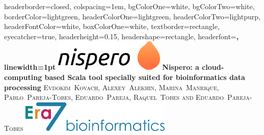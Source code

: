 \documentclass[portrait,a0paper,fontscale=0.285]{baposter} %
\begin{document}
\begin{poster}
{
headerborder=closed, %
colspacing=1em, %
bgColorOne=white, %
bgColorTwo=white, %
borderColor=lightgreen, %
headerColorOne=lightgreen, %
headerColorTwo=lightpurp, %
headerFontColor=white, %
boxColorOne=white, %
textborder=rectangle, %
eyecatcher=true, %
headerheight=0.15\textheight, %
headershape=rectangle, %
headerfont=\Large\bf\textsc, %
linewidth=1pt %
}
%
{\includegraphics[height=4em]{nispero.png}} %
{\hspace{1em}\bf{Nispero: a cloud-computing based Scala tool specially suited for bioinformatics data
processing}} %
{\textsc{Evdokim~Kovach, Alexey~Alekhin, Marina~Manrique, Pablo~Pareja-Tobes, Eduardo~Pareja, Raquel~Tobes and Eduardo~Pareja-Tobes}} %
{\includegraphics[height=4em]{era7.png}} %



\end{poster}
\end{document}
